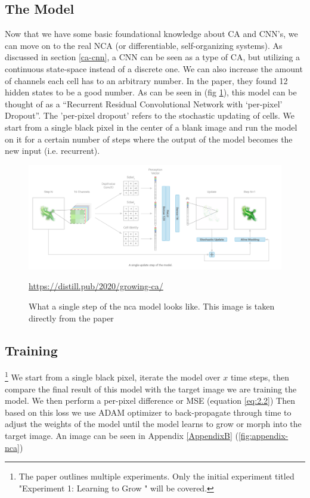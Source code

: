 \subsection{The Model}
Now that we have some basic foundational knowledge about CA and CNN's, we can move on to the real NCA (or differentiable, self-organizing systems). As discussed in section \ref{ca-cnn}, a CNN can be seen as a type of CA, but utilizing a continuous state-space instead of a discrete one. We can also increase the amount of channels each cell has to an arbitrary number. In the paper, they found 12 hidden states to be a good number. As can be seen in (fig \ref{fig:nca}), this model can be thought of as a “Recurrent Residual Convolutional Network with ‘per-pixel’ Dropout”. The 'per-pixel dropout' refers to the stochastic updating of cells. We start from a single black pixel in the center of a blank image and run the model on it for a certain number of steps where the output of the model becomes the new input (i.e. recurrent).
\begin{figure}[h]
	\includegraphics[width=1\textwidth]{../Figures/growing_nca.png}
	\centering
	\caption[NCA]{What a single step of the nca model looks like. This image is taken directly from the  paper \cite{growing_nca}} 
	\label{fig:nca}
	\url{https://distill.pub/2020/growing-ca/}
\end{figure}

\subsection{Training} \footnote{The paper outlines multiple experiments. Only the initial experiment titled "Experiment 1: Learning to Grow " will be covered.}
We start from a single black pixel, iterate the model over $x$ time steps, then compare the final result of this model with the target image we are training the model. We then perform a per-pixel difference or MSE (equation \ref{eq:2.2}) Then based on this loss we use ADAM optimizer to back-propagate through time to adjust the weights of the model until the model learns to grow or morph into the target image. An image can be seen in Appendix \ref{AppendixB} (\ref{fig:appendix-nca})

